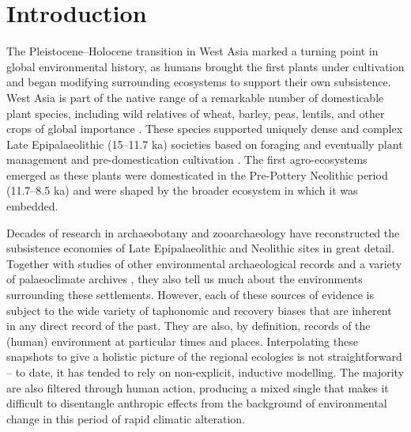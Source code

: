 \documentclass[
  authoryear,
  preprint]{elsarticle}
\begin{document}
\section{Introduction}\label{introduction}

The Pleistocene--Holocene transition in West Asia marked a turning point
in global environmental history, as humans brought the first plants
under cultivation and began modifying surrounding ecosystems to support
their own subsistence. West Asia is part of the native range of a
remarkable number of domesticable plant species, including wild
relatives of wheat, barley, peas, lentils, and other crops of global
importance \citep{HarlanZohary1966, Diamond2002, ZoharyEtAl2012}. These
species supported uniquely dense and complex Late Epipalaeolithic
(15--11.7 ka) societies \citep{BarYosef1998, MaherEtAl2012} based on
foraging \citep{HarrisHillman1989, Colledge2001, WeissEtAl2004} and
eventually plant management and pre-domestication cultivation
\citep{Colledge2001, WeissEtAl2006, Harris2007, WillcoxEtAl2008}. The
first agro-ecosystems emerged as these plants were domesticated in the
Pre-Pottery Neolithic period (11.7--8.5 ka) and were shaped by the
broader ecosystem in which it was embedded.

Decades of research in archaeobotany and zooarchaeology have
reconstructed the subsistence economies of Late Epipalaeolithic and
Neolithic sites in great detail. Together with studies of other
environmental archaeological records and a variety of palaeoclimate
archives \citep{JonesEtAl2019}, they also tell us much about the
environments surrounding these settlements. However, each of these
sources of evidence is subject to the wide variety of taphonomic and
recovery biases that are inherent in any direct record of the past. They
are also, by definition, records of the (human) environment at
particular times and places. Interpolating these snapshots to give a
holistic picture of the regional ecologies is not straightforward -- to
date, it has tended to rely on non-explicit, inductive modelling. The
majority are also filtered through human action, producing a mixed
single that makes it difficult to disentangle anthropic effects from the
background of environmental change in this period of rapid climatic
alteration.
\end{document}
